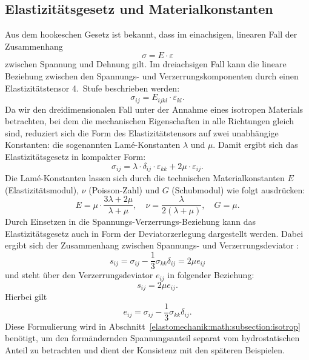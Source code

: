 \subsection{Elastizitätsgesetz und Materialkonstanten}
Aus dem hookeschen Gesetz ist bekannt, dass im einachsigen, linearen
Fall der Zusammenhang
\begin{equation*}
	\sigma = 
	E \cdot \varepsilon
\end{equation*}
zwischen Spannung und Dehnung gilt.
Im dreiachsigen Fall kann die lineare Beziehung zwischen den
Spannungs- und Verzerrungskomponenten durch einen Elastizitätstensor
4.~Stufe beschrieben werden:
\begin{equation*}
	\sigma_{ij} = 
	E_{ijkl} \cdot \varepsilon_{kl}.
\end{equation*}
Da wir den dreidimensionalen Fall unter der Annahme eines isotropen
Materials betrachten, bei dem die mechanischen Eigenschaften in
alle Richtungen gleich sind, reduziert sich die Form des
Elastizitätstensors auf zwei unabhängige Konstanten: die sogenannten
Lamé-Konstanten $\lambda$ und $\mu$.
Damit ergibt sich das Elastizitätsgesetz in kompakter Form:
\begin{equation*}
	\sigma_{ij} = 
	\lambda \cdot \delta_{ij} \cdot \varepsilon_{kk} + 2\mu \cdot \varepsilon_{ij}.
\end{equation*}
Die Lamé-Konstanten lassen sich durch die technischen Materialkonstanten
$E$ (Elastizitätsmodul), $\nu$ (Poisson-Zahl) und $G$ (Schubmodul)
wie folgt ausdrücken:
\begin{equation*}
	E = 
	\mu \cdot \frac{3\lambda + 2\mu}{\lambda + \mu}, \quad 
	\nu = 
	\frac{\lambda}{2(\lambda + \mu)}, \quad 
	G = 
	\mu.
\end{equation*}
Durch Einsetzen in die Spannungs-Verzerrungs-Beziehung kann das
Elastizitätsgesetz auch in Form der Deviatorzerlegung dargestellt
werden.
Dabei ergibt sich der Zusammenhang zwischen Spannungs- und
Verzerrungsdeviator
%
\cite{elastomechanik:Grundlagen_der_Elastizitaetstheorie}:
\begin{equation*}
	s_{ij} = 
	\sigma_{ij} - \frac{1}{3} \sigma_{kk} \delta_{ij} = 
	2\mu e_{ij}
\end{equation*}
und steht über den Verzerrungsdeviator $e_{ij}$ in folgender Beziehung:
\begin{equation*}
	s_{ij} = 
	2\mu e_{ij}.
\end{equation*}
Hierbei gilt
\begin{equation*}
	e_{ij} = 
	\sigma_{ij} - \frac{1}{3} \sigma_{kk} \delta_{ij}.
\end{equation*}
Diese Formulierung wird in
Abschnitt~\ref{elastomechanik:math:subsection:isotrop}
benötigt, um den formändernden Spannungsanteil separat vom
hydrostatischen Anteil zu betrachten und dient der Konsistenz mit
%
den späteren Beispielen.
